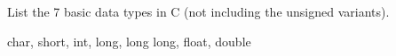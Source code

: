List the 7 basic data types in C (not including the unsigned variants).

\begin{answer}
char, short, int, long, long long, float, double
\end{answer}